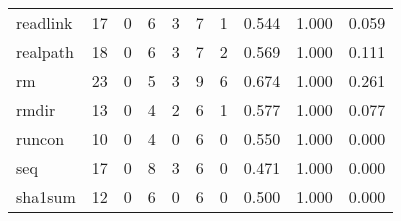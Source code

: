 \begin{longtable}{lp{1.3cm}p{1.3cm}p{1.3cm}p{1.3cm}p{1.3cm}p{1.3cm}p{1.3cm}p{1.3cm}p{1.3cm}}
readlink  &                     17 &                                             0 &                                            6 &                                           3 &                                            7 &                                          1 &                                0.544 &                                  1.000 &                                0.059 \\
realpath  &                     18 &                                             0 &                                            6 &                                           3 &                                            7 &                                          2 &                                0.569 &                                  1.000 &                                0.111 \\
rm        &                     23 &                                             0 &                                            5 &                                           3 &                                            9 &                                          6 &                                0.674 &                                  1.000 &                                0.261 \\
rmdir     &                     13 &                                             0 &                                            4 &                                           2 &                                            6 &                                          1 &                                0.577 &                                  1.000 &                                0.077 \\
runcon    &                     10 &                                             0 &                                            4 &                                           0 &                                            6 &                                          0 &                                0.550 &                                  1.000 &                                0.000 \\
seq       &                     17 &                                             0 &                                            8 &                                           3 &                                            6 &                                          0 &                                0.471 &                                  1.000 &                                0.000 \\
sha1sum   &                     12 &                                             0 &                                            6 &                                           0 &                                            6 &                                          0 &                                0.500 &                                  1.000 &                                0.000 \\

\end{longtable}
